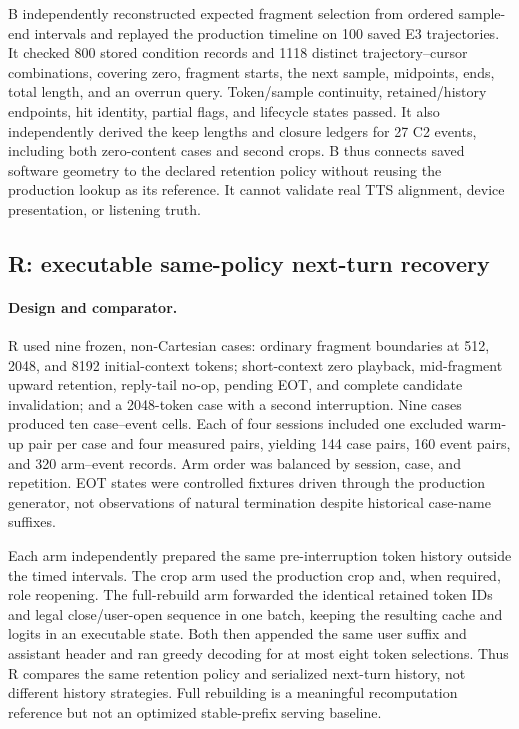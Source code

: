 B independently reconstructed expected fragment selection from ordered sample-end intervals and replayed the production timeline on 100 saved E3 trajectories. It checked 800 stored condition records and 1118 distinct trajectory--cursor combinations, covering zero, fragment starts, the next sample, midpoints, ends, total length, and an overrun query. Token/sample continuity, retained/history endpoints, hit identity, partial flags, and lifecycle states passed. It also independently derived the keep lengths and closure ledgers for 27 C2 events, including both zero-content cases and second crops. B thus connects saved software geometry to the declared retention policy without reusing the production lookup as its reference. It cannot validate real TTS alignment, device presentation, or listening truth.

\subsection{R: executable same-policy next-turn recovery}
\label{sec:recovery-cost}

\paragraph{Design and comparator.}
R used nine frozen, non-Cartesian cases: ordinary fragment boundaries at 512, 2048, and 8192 initial-context tokens; short-context zero playback, mid-fragment upward retention, reply-tail no-op, pending EOT, and complete candidate invalidation; and a 2048-token case with a second interruption. Nine cases produced ten case--event cells. Each of four sessions included one excluded warm-up pair per case and four measured pairs, yielding 144 case pairs, 160 event pairs, and 320 arm--event records. Arm order was balanced by session, case, and repetition. EOT states were controlled fixtures driven through the production generator, not observations of natural termination despite historical case-name suffixes.

Each arm independently prepared the same pre-interruption token history outside the timed intervals. The crop arm used the production crop and, when required, role reopening. The full-rebuild arm forwarded the identical retained token IDs and legal close/user-open sequence in one batch, keeping the resulting cache and logits in an executable state. Both then appended the same user suffix and assistant header and ran greedy decoding for at most eight token selections. Thus R compares the same retention policy and serialized next-turn history, not different history strategies. Full rebuilding is a meaningful recomputation reference but not an optimized stable-prefix serving baseline.

